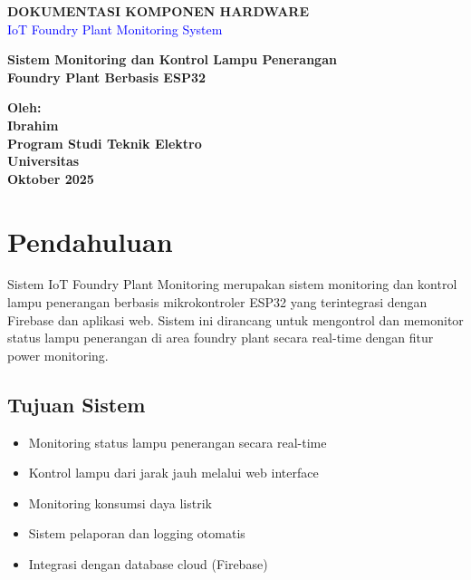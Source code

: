 \documentclass[12pt,a4paper]{article}
\begin{document}
\begin{titlepage}
\centering
\vspace*{2cm}
{\Huge\textbf{DOKUMENTASI KOMPONEN HARDWARE}}\\[0.5cm]
{\LARGE\textcolor{blue}{IoT Foundry Plant Monitoring System}}\\[1.5cm]

\begin{tcolorbox}[colback=orange!10, colframe=orange!60, width=0.8\textwidth]
\centering
\textbf{\Large Sistem Monitoring dan Kontrol Lampu Penerangan}\\
\textbf{\Large Foundry Plant Berbasis ESP32}
\end{tcolorbox}

\vspace{2cm}
\textbf{\large Oleh:}\\
\textbf{\large Ibrahim}\\[1cm]

\textbf{\large Program Studi Teknik Elektro}\\
\textbf{\large Universitas}\\[2cm]

\textbf{\large Oktober 2025}
\end{titlepage}

\newpage
\tableofcontents
\newpage

\section{Pendahuluan}

Sistem IoT Foundry Plant Monitoring merupakan sistem monitoring dan kontrol lampu penerangan berbasis mikrokontroler ESP32 yang terintegrasi dengan Firebase dan aplikasi web. Sistem ini dirancang untuk mengontrol dan memonitor status lampu penerangan di area foundry plant secara real-time dengan fitur power monitoring.

\subsection{Tujuan Sistem}
\begin{itemize}
\item Monitoring status lampu penerangan secara real-time
\item Kontrol lampu dari jarak jauh melalui web interface
\item Monitoring konsumsi daya listrik
\item Sistem pelaporan dan logging otomatis
\item Integrasi dengan database cloud (Firebase)
\end{itemize}
\end{document}
